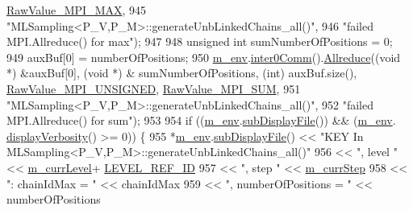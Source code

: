 \begin{DoxyCode}
      \hyperlink{_mpi_comm_8h_a68f3ac7ff71a6504e236b0c95de78178}{RawValue\_MPI\_MAX},
945                                  \textcolor{stringliteral}{"MLSampling<P\_V,P\_M>::generateUnbLinkedChains\_all()"},
946                                  \textcolor{stringliteral}{"failed MPI.Allreduce() for max"});
947 
948     \textcolor{keywordtype}{unsigned} \textcolor{keywordtype}{int} sumNumberOfPositions = 0;
949     auxBuf[0] = numberOfPositions;
950     \hyperlink{class_q_u_e_s_o_1_1_m_l_sampling_a13f1ca4fe9f94822fe572a743eaced1d}{m\_env}.\hyperlink{class_q_u_e_s_o_1_1_base_environment_a689e4d140c74d495d97eb498714a4b82}{inter0Comm}().\hyperlink{class_q_u_e_s_o_1_1_mpi_comm_a72e137e60ef8060efb1ee5fc874fa4b8}{Allreduce}((\textcolor{keywordtype}{void} *) &auxBuf[0], (\textcolor{keywordtype}{void} *) &
      sumNumberOfPositions, (\textcolor{keywordtype}{int}) auxBuf.size(), \hyperlink{_mpi_comm_8h_a06cbfbc33436f6e0dc8a48ff3c49bdfc}{RawValue\_MPI\_UNSIGNED}, 
      \hyperlink{_mpi_comm_8h_afbf78d291c032aa7f512bc566cee2bd1}{RawValue\_MPI\_SUM},
951                                  \textcolor{stringliteral}{"MLSampling<P\_V,P\_M>::generateUnbLinkedChains\_all()"},
952                                  \textcolor{stringliteral}{"failed MPI.Allreduce() for sum"});
953 
954     \textcolor{keywordflow}{if} ((\hyperlink{class_q_u_e_s_o_1_1_m_l_sampling_a13f1ca4fe9f94822fe572a743eaced1d}{m\_env}.\hyperlink{class_q_u_e_s_o_1_1_base_environment_a8a0064746ae8dddfece4229b9ad374d6}{subDisplayFile}()) && (\hyperlink{class_q_u_e_s_o_1_1_m_l_sampling_a13f1ca4fe9f94822fe572a743eaced1d}{m\_env}.
      \hyperlink{class_q_u_e_s_o_1_1_base_environment_a1fe5f244fc0316a0ab3e37463f108b96}{displayVerbosity}() >= 0)) \{
955       *\hyperlink{class_q_u_e_s_o_1_1_m_l_sampling_a13f1ca4fe9f94822fe572a743eaced1d}{m\_env}.\hyperlink{class_q_u_e_s_o_1_1_base_environment_a8a0064746ae8dddfece4229b9ad374d6}{subDisplayFile}() << \textcolor{stringliteral}{"KEY In
       MLSampling<P\_V,P\_M>::generateUnbLinkedChains\_all()"}
956                               << \textcolor{stringliteral}{", level "}               << \hyperlink{class_q_u_e_s_o_1_1_m_l_sampling_af9416874c856e50f3b35270e801f17e4}{m\_currLevel}+
      \hyperlink{_m_l_sampling_level_options_8h_a68d15eaf394d210effcf584b938206d3}{LEVEL\_REF\_ID}
957                               << \textcolor{stringliteral}{", step "}                << \hyperlink{class_q_u_e_s_o_1_1_m_l_sampling_a1b1f8ccb4823bdfa26ec652f0807c63e}{m\_currStep}
958                               << \textcolor{stringliteral}{": chainIdMax = "}        << chainIdMax
959                               << \textcolor{stringliteral}{", numberOfPositions = "} << numberOfPositions

\end{DoxyCode}
